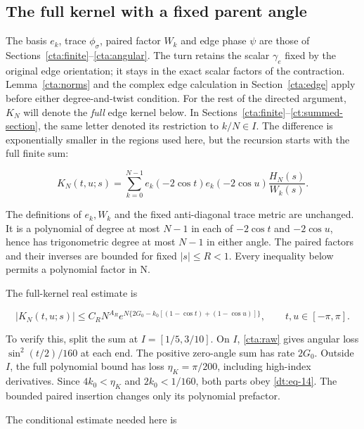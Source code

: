 \subsection{The full kernel with a fixed parent angle}\label{dt:sec-2}

The basis \(e_k\), trace \(\phi_\sigma\), paired factor \(W_k\) and
edge phase \(\psi\) are those of Sections~\ref{cta:finite}--\ref{cta:angular}.
The turn retains the scalar \(\gamma_e\) fixed by the original edge
orientation; it stays in the exact scalar factors of the contraction.
Lemma~\ref{cta:norms} and the complex edge calculation in
Section~\ref{cta:edge} apply before either degree-and-twist condition.
For the rest of the directed argument, $K_N$ will denote the
\emph{full} edge kernel below. In Sections~\ref{cta:finite}--\ref{ct:summed-section},
the same letter denoted its restriction to $k/N\in I$. The
difference is exponentially smaller in the regions used here, but
the recursion starts with the full finite sum:

\begin{equation}\label{dt:eq-13}
K_N(t,u;s)=\sum_{k=0}^{N-1}
       e_k(-2\cos t)e_k(-2\cos u)\frac{H_N(s)}{W_k(s)}.
\end{equation}

The definitions of \(e_k,W_k\) and the fixed anti-diagonal trace metric are
unchanged. It is a polynomial of degree at most \(N-1\) in each of
\(-2\cos t\) and \(-2\cos u\), hence has trigonometric degree at most
\(N-1\) in either angle.
The paired factors and their inverses are bounded for fixed \(|s|\le R<1\).
Every inequality below permits a polynomial factor in N.

The full-kernel real estimate is

\begin{equation}\label{dt:eq-14}
|K_N(t,u;s)|\le C_RN^{A_R}
   e^{N\{2G_0-k_0[(1-\cos t)+(1-\cos u)]\}},
                 \qquad t,u\in[-\pi,\pi].
\end{equation}

To verify this, split the sum at \(I=[1/5,3/10]\).
On \(I\), \eqref{cta:raw} gives angular loss
\(\sin^2(t/2)/160\) at each end. The positive zero-angle sum
has rate \(2G_0\). Outside \(I\), the full polynomial bound
has loss \(\eta_K=\pi/200\), including high-index derivatives.
Since \(4k_0<\eta_K\) and \(2k_0<1/160\), both parts obey
\eqref{dt:eq-14}. The bounded paired insertion changes only its
polynomial prefactor.

The conditional estimate needed here is

